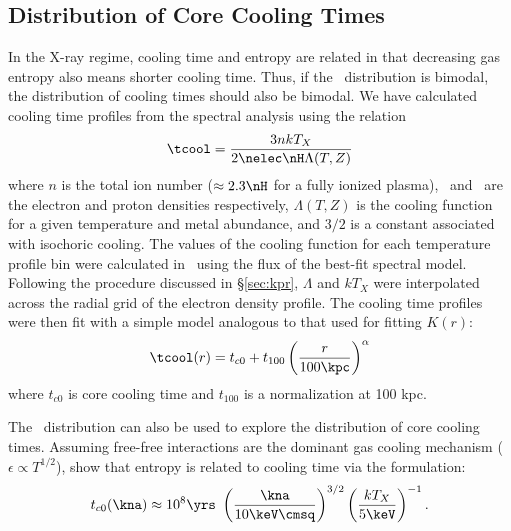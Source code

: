 \documentclass[apj]{emulateapj}
\begin{document}


\subsection{Distribution of Core Cooling Times}
\label{sec:hifl}

In the X-ray regime, cooling time and entropy are related in that
decreasing gas entropy also means shorter cooling time. Thus, if the
\kna\ distribution is bimodal, the distribution of cooling times
should also be bimodal. We have calculated cooling time profiles from
the spectral analysis using the relation
\begin{equation}
\tcool = \frac{3nkT_X}{2\nelec \nH \Lambda(T,Z)}
\label{eqn:tcool}
\end{equation}
where $n$ is the total ion number ($\approx 2.3\nH$ for a fully
ionized plasma), \nelec\ and \nH\ are the electron and proton
densities respectively, $\Lambda(T,Z)$ is the cooling function for a
given temperature and metal abundance, and $3/2$ is a constant
associated with isochoric cooling. The values of the cooling function
for each temperature profile bin were calculated in \xspec\ using the
flux of the best-fit spectral model. Following the procedure discussed
in \S\ref{sec:kpr}, $\Lambda$ and $kT_X$ were interpolated across the
radial grid of the electron density profile. The cooling time profiles
were then fit with a simple model analogous to that used for fitting
$K(r)$:
\begin{equation}
\tcool(r) = t_{c0} + t_{100} \left(\frac{r}{100 \kpc}\right)^{\alpha}
\label{eqn:tc0}
\end{equation}
where $t_{c0}$ is core cooling time and $t_{100}$ is a normalization
at 100 kpc.

The \kna\ distribution can also be used to explore the distribution of
core cooling times. Assuming free-free interactions are the dominant
gas cooling mechanism (\ie\ $\epsilon \propto T^{1/2}$),
\citet{radioquiet} show that entropy is related to cooling time via
the formulation:
\begin{equation}
t_{c0}(\kna) \approx 10^8 \yrs\ \left(\frac{\kna}{10 \keV \cmsq}\right)^{3/2} \left(\frac{kT_X}{5 \keV}\right)^{-1}.
\label{eqn:tck0}
\end{equation}
\end{document}
